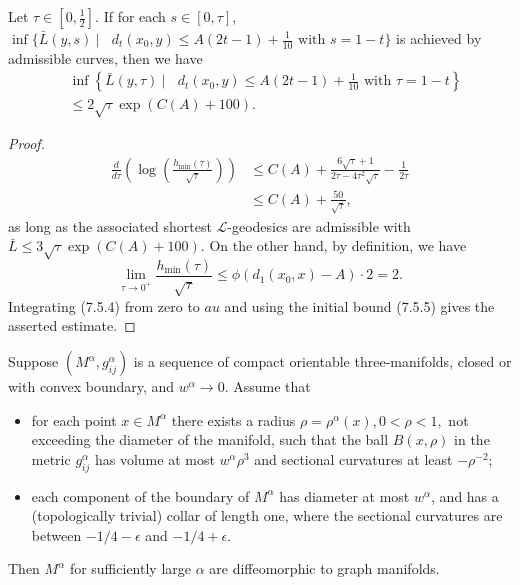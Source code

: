 \begin{lemma}
  \label{lem:cz-admissible-minimizer-reduced-length-bound}
Let $\tau\in[0,\frac{1}{2}]$. If for each
$s\in[0,\tau]$, $\inf\{\bar{L}(y,s)\ |\ \mbox{ } d_t(x_0,y)\leq
A(2t-1)+\frac{1}{10}\mbox{ with }s=1-t\}$ is achieved by
admissible curves, then we have
\begin{align}
&\inf\left\{\bar{L}(y,\tau)\ |\ \mbox{ } d_t(x_0,y)
\leq A(2t-1)+\frac{1}{10}\mbox{ with }\tau=1-t\right\}\\
&\leq 2\sqrt{\tau}\exp(C(A)+100). \nonumber  %
\end{align}
\end{lemma}
\begin{proof}
\begin{align}
\frac{d}{d\tau}\left(\log\left(\frac{h_{\min}(\tau)}{\sqrt{\tau}}\right)\right) &
\leq C(A)+\frac{6\sqrt{\tau}+1}{2\tau-4\tau^2\sqrt{\tau}}
-\frac{1}{2\tau}\\
& \leq C(A)+\frac{50}{\sqrt{\tau}}, \nonumber
\end{align} %
as long as the associated shortest $\mathcal{L}$-geodesics are
admissible with $\bar{L} \leq 3\sqrt{\tau}\exp(C(A)+100)$. On the
other hand, by definition, we have \begin{equation} \lim_{\tau\rightarrow
0^+}\frac{h_{\min}(\tau)}{\sqrt{\tau}}\leq
\phi(d_1(x_0,x)-A)\cdot 2=2. %
\end{equation} Integrating (7.5.4) from zero to $	au$ and using the initial bound (7.5.5) gives the asserted estimate.
\end{proof}

\begin{proposition}
  \label{prop:cz-perelman-collapsing-graph-manifold-criterion}
Suppose $(M^{\alpha},g^{\alpha}_{ij})$ is a
sequence of compact orientable three-manifolds, closed or with
convex boundary, and $w^{\alpha}\rightarrow  0$. Assume that
\begin{itemize}
\item[(1)] for each point $x \in M^{\alpha}$ there exists a radius
$\rho = \rho^{\alpha}(x), 0<\rho<1,$ not exceeding the diameter of
the manifold, such that the ball $B(x,\rho)$ in the metric
$g^{\alpha}_{ij}$ has volume at most $w^{\alpha}\rho^3$ and
sectional curvatures at least $-\rho^{-2}$; \item[(2)] each
component of the boundary of $M^{\alpha}$ has diameter at most
$w^{\alpha}$, and has a (topologically trivial) collar of length
one, where the sectional curvatures are between $-1/4 - \epsilon$
and $-1/4 + \epsilon$.
\end{itemize}

Then $M^{\alpha}$ for sufficiently large $\alpha$ are
diffeomorphic to graph manifolds.
\end{proposition}

